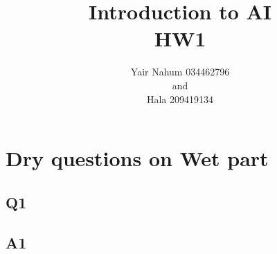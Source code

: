 \documentclass[12pt]{article}
\title{Introduction to AI\\HW1}
\author{Yair Nahum 034462796\\and\\Hala 209419134 }
\begin{document}
\maketitle


\section*{Dry questions on Wet part}

\subsection*{Q1}
\subsection*{A1}
\end{document}
